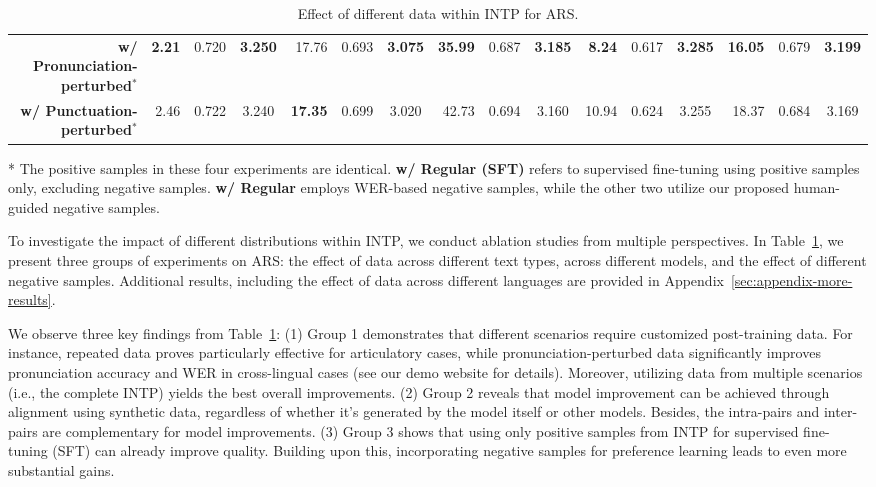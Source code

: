 \documentclass[11pt]{article}
\begin{document}
\begin{table}[t]
\begin{center}
{\begin{threeparttable}
\begin{tabular}{c||rrc|rrc|rrc|rrc||rrc}
    \multicolumn{1}{r||}{\textbf{w/ Pronunciation-perturbed}$^*$} & \textbf{2.21} & 0.720 & \textbf{3.250} & 17.76 & 0.693 & \textbf{3.075} & \textbf{35.99} & 0.687 & \textbf{3.185} & \textbf{8.24} & 0.617 & \textbf{3.285} & \textbf{16.05} & 0.679 & \textbf{3.199} \\
    \multicolumn{1}{r||}{\textbf{w/ Punctuation-perturbed}$^*$} & 2.46 & 0.722 & 3.240 & \textbf{17.35} & 0.699 & 3.020 & 42.73 & 0.694 & 3.160 & 10.94 & 0.624 & 3.255 & 18.37 & 0.684 & 3.169 \\
    \bottomrule
    \end{tabular}
    \begin{tablenotes}
        \item[*] The positive samples in these four experiments are identical. \textbf{w/ Regular (SFT)} refers to supervised fine-tuning using positive samples only, excluding negative samples. \textbf{w/ Regular} employs WER-based negative samples, while the other two utilize our proposed human-guided negative samples.
    \end{tablenotes}
\end{threeparttable}
}
\caption{Effect of different data within INTP for ARS.}
\label{tab:expt-abs-total}
\end{center}
\end{table}

To investigate the impact of different distributions within INTP, we conduct ablation studies from multiple perspectives. In Table~\ref{tab:expt-abs-total}, we present three groups of experiments on ARS: the effect of data across different text types, across different models, and the effect of different negative samples. Additional results, including the effect of data across different languages are provided in Appendix~\ref{sec:appendix-more-results}.

We observe three key findings from Table~\ref{tab:expt-abs-total}: (1) Group 1 demonstrates that different scenarios require customized post-training data. For instance, repeated data proves particularly effective for articulatory cases, while pronunciation-perturbed data significantly improves pronunciation accuracy and WER in cross-lingual cases (see our demo website for details). Moreover, utilizing data from multiple scenarios (i.e., the complete INTP) yields the best overall improvements. (2) Group 2 reveals that model improvement can be achieved through alignment using synthetic data, regardless of whether it's generated by the model itself or other models. Besides, the intra-pairs and inter-pairs are complementary for model improvements. (3) Group 3 shows that using only positive samples from INTP for supervised fine-tuning (SFT) can already improve quality. Building upon this, incorporating negative samples for preference learning leads to even more substantial gains. 
\end{document}
